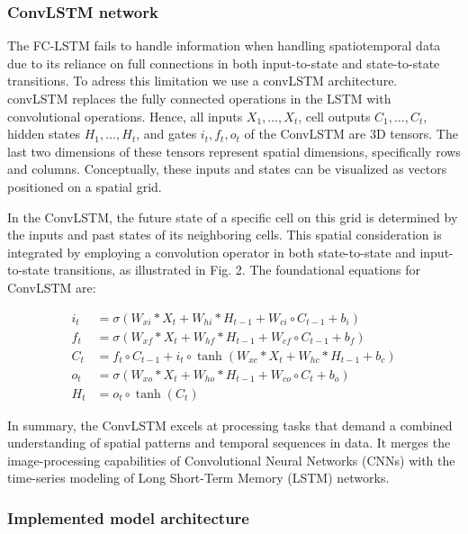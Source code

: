 \documentclass[
  letterpaper,
  DIV=11,
  numbers=noendperiod]{scrartcl}
\begin{document}
\hypertarget{convlstm-network}{%
\subsubsection{ConvLSTM network}\label{convlstm-network}}

The FC-LSTM fails to handle information when handling spatiotemporal
data due to its reliance on full connections in both input-to-state and
state-to-state transitions. To adress this limitation we use a convLSTM
architecture. convLSTM replaces the fully connected operations in the
LSTM with convolutional operations. Hence, all inputs
\(X_1, \ldots, X_t\), cell outputs \(C_1, \ldots, C_t\), hidden states
\(H_1, \ldots, H_t\), and gates \(i_t, f_t, o_t\) of the ConvLSTM are 3D
tensors. The last two dimensions of these tensors represent spatial
dimensions, specifically rows and columns. Conceptually, these inputs
and states can be visualized as vectors positioned on a spatial grid.

In the ConvLSTM, the future state of a specific cell on this grid is
determined by the inputs and past states of its neighboring cells. This
spatial consideration is integrated by employing a convolution operator
in both state-to-state and input-to-state transitions, as illustrated in
Fig. 2. The foundational equations for ConvLSTM are:

\[
\begin{aligned}
i_t &= \sigma(W_{xi} \ast X_t + W_{hi} \ast H_{t-1} + W_{ci} \circ C_{t-1} + b_i) \\
f_t &= \sigma(W_{xf} \ast X_t + W_{hf} \ast H_{t-1} + W_{cf} \circ C_{t-1} + b_f) \\
C_t &= f_t \circ C_{t-1} + i_t \circ \tanh(W_{xc} \ast X_t + W_{hc} \ast H_{t-1} + b_c) \\
o_t &= \sigma(W_{xo} \ast X_t + W_{ho} \ast H_{t-1} + W_{co} \circ C_t + b_o) \\
H_t &= o_t \circ \tanh(C_t)
\end{aligned}
\]

In summary, the ConvLSTM excels at processing tasks that demand a
combined understanding of spatial patterns and temporal sequences in
data. It merges the image-processing capabilities of Convolutional
Neural Networks (CNNs) with the time-series modeling of Long Short-Term
Memory (LSTM) networks.

\hypertarget{implemented-model-architecture}{%
\subsubsection{Implemented model
architecture}\label{implemented-model-architecture}}
\end{document}
